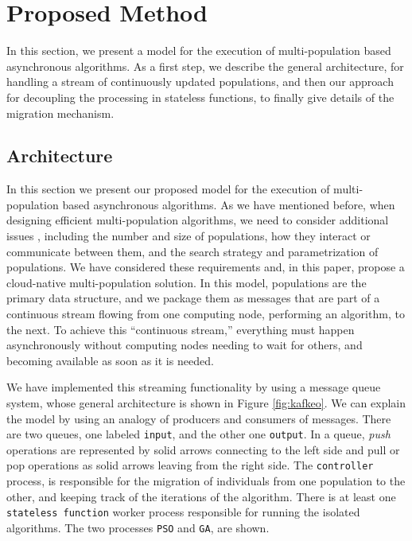 \section{Proposed Method}
\label{method}
%
% 
In this section, we present a model for the execution of multi-population based
asynchronous algorithms. As a first step, we describe the general architecture,
for handling a stream of continuously updated populations,  and then our
approach for decoupling the processing in stateless functions, to finally give
details of the migration mechanism.


\subsection{Architecture}
\label{arch}

In this section we present our proposed model for the execution of
multi-population based asynchronous algorithms. As we have mentioned before, when
designing efficient multi-population algorithms, we need to consider additional
issues \cite{Ma2019}, including the number and size of populations, how they
interact or communicate between them, and the search strategy and parametrization of
populations. We have considered these requirements and, in this paper,
propose a cloud-native
multi-population solution. In this model, populations are the primary data
structure, and we package them as messages that are part of a continuous stream flowing
from one computing node, performing an algorithm, to the next. To achieve this ``continuous stream,''
everything must happen asynchronously without computing nodes needing to wait for
others, and becoming available as soon as it is needed.

We have implemented this streaming functionality by using a message queue
system, whose general architecture is shown in Figure \ref{fig:kafkeo}. We can explain
the model by using an analogy of producers and consumers of messages. There are
two queues, one labeled \texttt{input}, and the other one \texttt{output}. In a
queue, {\em push} operations are represented by solid arrows connecting to the
left side and pull or pop operations as solid arrows leaving from the right
side. The \texttt{controller} process, is responsible for the migration of
individuals from one population to the other, and keeping track of the
iterations of the algorithm. There is at least one \texttt{stateless function}
worker process responsible for running the isolated algorithms. The two
processes \texttt{PSO} and \texttt{GA}, are shown.

